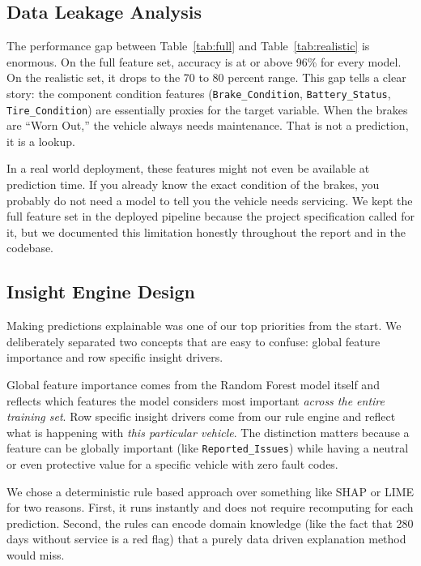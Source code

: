 \documentclass[conference]{IEEEtran}
\begin{document}
\subsection{Data Leakage Analysis}

The performance gap between Table~\ref{tab:full} and Table~\ref{tab:realistic} is enormous. On the full feature set, accuracy is at or above 96\% for every model. On the realistic set, it drops to the 70 to 80 percent range. This gap tells a clear story: the component condition features (\texttt{Brake\_Condition}, \texttt{Battery\_Status}, \texttt{Tire\_Condition}) are essentially proxies for the target variable. When the brakes are ``Worn Out,'' the vehicle always needs maintenance. That is not a prediction, it is a lookup.

In a real world deployment, these features might not even be available at prediction time. If you already know the exact condition of the brakes, you probably do not need a model to tell you the vehicle needs servicing. We kept the full feature set in the deployed pipeline because the project specification called for it, but we documented this limitation honestly throughout the report and in the codebase.

\subsection{Insight Engine Design}

Making predictions explainable was one of our top priorities from the start. We deliberately separated two concepts that are easy to confuse: global feature importance and row specific insight drivers.

Global feature importance comes from the Random Forest model itself and reflects which features the model considers most important \textit{across the entire training set}. Row specific insight drivers come from our rule engine and reflect what is happening with \textit{this particular vehicle}. The distinction matters because a feature can be globally important (like \texttt{Reported\_Issues}) while having a neutral or even protective value for a specific vehicle with zero fault codes.

We chose a deterministic rule based approach over something like SHAP or LIME for two reasons. First, it runs instantly and does not require recomputing for each prediction. Second, the rules can encode domain knowledge (like the fact that 280 days without service is a red flag) that a purely data driven explanation method would miss.
\end{document}
